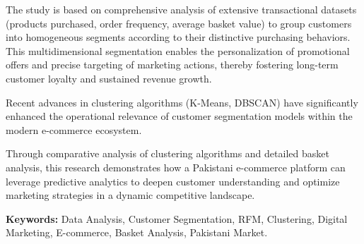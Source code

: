 \documentclass[a4paper,12pt]{article}
\begin{document}
The study is based on comprehensive analysis of extensive transactional datasets (products purchased, order frequency, average basket value) to group customers into homogeneous segments according to their distinctive purchasing behaviors. This multidimensional segmentation enables the personalization of promotional offers and precise targeting of marketing actions, thereby fostering long-term customer loyalty and sustained revenue growth.

Recent advances in clustering algorithms (K-Means, DBSCAN) have significantly enhanced the operational relevance of customer segmentation models within the modern e-commerce ecosystem.

Through comparative analysis of clustering algorithms and detailed basket analysis, this research demonstrates how a Pakistani e-commerce platform can leverage predictive analytics to deepen customer understanding and optimize marketing strategies in a dynamic competitive landscape.

\textbf{Keywords:} Data Analysis, Customer Segmentation, RFM, Clustering, Digital Marketing, E-commerce, Basket Analysis, Pakistani Market.
\end{document}

